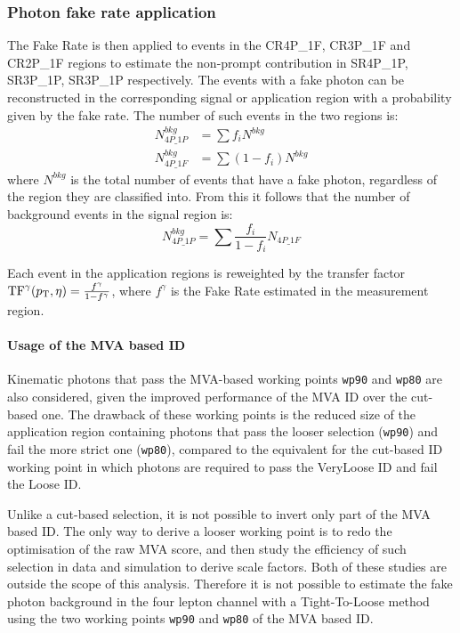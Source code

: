 \subsubsection{Photon fake rate application}
The Fake Rate is then applied to events in the CR4P\_1F, CR3P\_1F and CR2P\_1F regions to estimate the non-prompt contribution in SR4P\_1P, SR3P\_1P, SR3P\_1P respectively.
The events with a fake photon can be reconstructed in the corresponding signal or application region
with a probability given by the fake rate.
The number of such events in the two regions is:
\begin{equation}
  \begin{split}
    \label{eq:fakeRate_explanation_part1}
    N^{bkg}_{4P\_1P} &= \sum f_i N^{bkg}
    \\
    N^{bkg}_{4P\_1F} &= \sum ( 1-f_i ) N^{bkg}
  \end{split}
\end{equation}
where $N^{bkg}$ is the total number of events that have a fake photon, regardless of the region they are classified into.
From this it follows that the number of background events in the signal region is:
\begin{equation}
  \label{eq:fakeRate_explanation_part2}
  N^{bkg}_{4P\_1P} = \sum \frac{f_i}{1-f_i} N_{4P\_1F}
\end{equation}

Each event in the application regions is reweighted by the transfer factor
$\text{TF}^\gamma(p_{\mathrm{T}}, \eta) = \frac{f^\gamma}{1-f^\gamma}$,
where $f^\gamma$ is the Fake Rate estimated in the measurement region.

\paragraph{Usage of the MVA based ID\\}
Kinematic photons that pass the MVA-based working points \texttt{wp90} and \texttt{wp80} are also considered,
given the improved performance of the MVA ID over the cut-based one.
The drawback of these working points is the reduced size of the application region containing
photons that pass the looser selection (\texttt{wp90}) and fail the more strict one (\texttt{wp80}),
compared to the equivalent for the cut-based ID working point
in which photons are required to pass the VeryLoose ID and fail the Loose ID.

Unlike a cut-based selection, it is not possible to invert only part of the MVA based ID.
The only way to derive a looser working point is to redo the optimisation of the raw MVA score,
and then study the efficiency of such selection in data and simulation to derive scale factors.
Both of these studies are outside the scope of this analysis.
Therefore it is not possible to estimate the fake photon background in the four lepton channel
with a Tight-To-Loose method using the two working points \texttt{wp90} and \texttt{wp80} of the MVA based ID.

